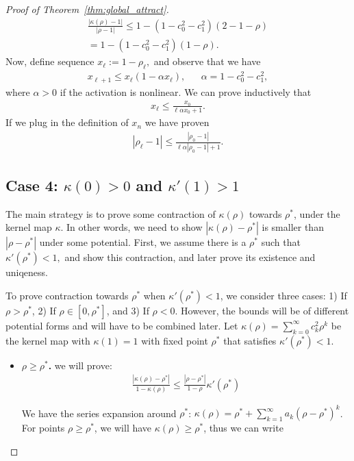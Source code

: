 \documentclass[twoside]{article}
\theoremstyle{definition}
\begin{document}
\begin{proof}[Proof of Theorem~\ref{thm:global_attract}]
\begin{align*}
    \frac{|\kappa(\rho)-1|}{|\rho-1|} \le 1-(1-c_0^2-c_1^2)(2-1-\rho) \\
    = 1- (1-c_0^2-c_1^2) (1-\rho).
\end{align*}
Now, define sequence $x_\ell:= 1-\rho_\ell,$ and observe that we have 
\begin{align*}
    x_{\ell+1} \le x_\ell (1-\alpha x_\ell), && \alpha = 1-c_0^2-c_1^2,
\end{align*}
where $\alpha > 0$ if the activation is nonlinear. 
We can prove inductively that 
\begin{align*}
x_\ell\le \frac{x_0}{\ell\alpha x_0 + 1}.
\end{align*}
If we plug in the definition of $x_n$ we have proven
\begin{align*}
|\rho_\ell-1| \le \frac{|\rho_0-1|}{\ell \alpha |\rho_0-1| + 1}.
\end{align*}

\subsection*{Case 4: $\kappa(0)>0$ and $\kappa'(1)>1$}
The main strategy is to prove some contraction of $\kappa(\rho)$ towards $\rho^*$, under the kernel map $\kappa$. In other words, we need to show $|\kappa(\rho)-\rho^*|$ is smaller than $|\rho-\rho^*|$ under some potential. First, we assume there is a $\rho^*$ such that $\kappa'(\rho^*)<1,$ and show this contraction, and later prove its existence and uniqeness. 

To prove contraction towards $\rho^*$ when $\kappa'(\rho^*)<1$, we consider three cases: 1) If $\rho > \rho^*$, 2) If $\rho \in [0,\rho^*]$, and 3) If $\rho < 0$. However, the bounds will be of different potential forms and will have to be combined later. Let $\kappa(\rho) = \sum_{k=0}^\infty c_k^2 \rho^k$ be the kernel map with $\kappa(1)= 1$ with fixed point $\rho^*$ that satisfies $\kappa'(\rho^*)<1.$

\begin{itemize}
\item \textbf{$\rho\ge \rho^*$.} we will prove:
\begin{align*}
\frac{|\kappa(\rho)-\rho^*|}{1-\kappa(\rho)} \le \frac{|\rho-\rho^*|}{1-\rho} \kappa'(\rho^*)
\end{align*}

We have the series expansion around $\rho^*$: $\kappa(\rho) = \rho^* + \sum_{k=1}^\infty a_k (\rho-\rho^*)^k$. For points $\rho\ge \rho^*$, we will have $\kappa(\rho)\ge \rho^*$, thus we can write


\end{itemize}
\end{proof}
\end{document}
